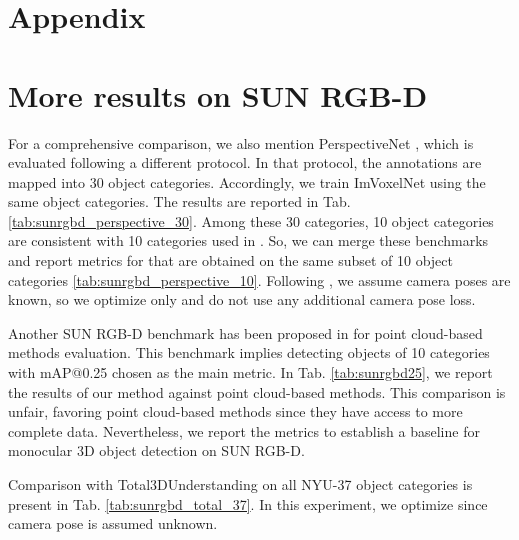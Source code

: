 \documentclass[10pt,twocolumn,letterpaper]{article}
\begin{document}
\clearpage

\begingroup
    \small
    
    
\endgroup

\clearpage

\section*{Appendix}

\appendix

\section{More results on SUN RGB-D} \label{sec:sunrgbd}

For a comprehensive comparison, we also mention PerspectiveNet \cite{huang2019perspectivenet}, which is evaluated following a different protocol. In that protocol, the annotations are mapped into 30 object categories. Accordingly, we train ImVoxelNet using the same object categories. The results are reported in Tab. \ref{tab:sunrgbd_perspective_30}. Among these 30 categories, 10 object categories are consistent with 10 categories used in \cite{huang2018holistic, huang2018cooperative, nie2020total3dunderstanding}. So, we can merge these benchmarks and report metrics for \cite{huang2018holistic, huang2018cooperative, nie2020total3dunderstanding, huang2019perspectivenet} that are obtained on the same subset of 10 object categories \ref{tab:sunrgbd_perspective_10}. Following \cite{huang2019perspectivenet}, we assume camera poses are known, so we optimize only  and do not use any additional camera pose loss.

Another SUN RGB-D benchmark has been proposed in \cite{qi2019votenet} for point cloud-based methods evaluation. This benchmark implies detecting objects of 10 categories with mAP@0.25 chosen as the main metric. In Tab. \ref{tab:sunrgbd25}, we report the results of our method against point cloud-based methods. This comparison is unfair, favoring point cloud-based methods since they have access to more complete data. Nevertheless, we report the metrics to establish a baseline for monocular 3D object detection on SUN RGB-D.

Comparison with Total3DUnderstanding \cite{nie2020total3dunderstanding} on all NYU-37 object categories is present in Tab. \ref{tab:sunrgbd_total_37}. In this experiment, we optimize  since camera pose is assumed unknown.
\end{document}
